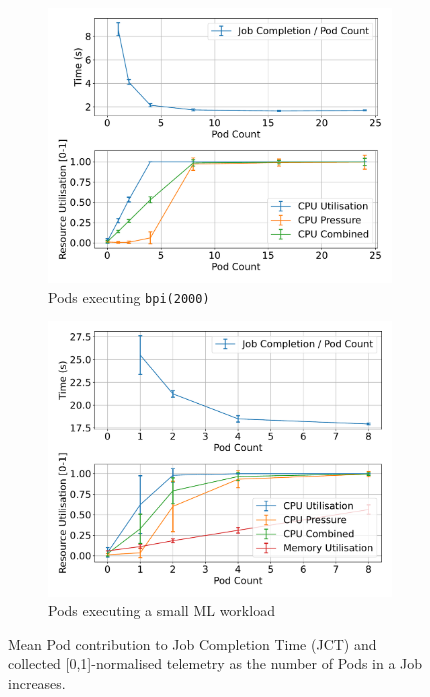 \begin{figure}[ht!] %
    \centering %
    \begin{subfigure}[b]{0.48\textwidth} %
        \centering
        \includegraphics[width=\textwidth]{images/podcount-util-pressure.pdf}
        \caption{Pods executing \texttt{bpi(2000)}} %
    \end{subfigure}%
    \hfill %
    \begin{subfigure}[b]{0.48\textwidth}
        \centering
        \includegraphics[width=\textwidth]{images/ml-podcount-util-pressure.pdf}
        \caption{Pods executing a small ML workload} %
    \end{subfigure}
    \caption{Mean Pod contribution to Job Completion Time (JCT) and collected
    [0,1]-normalised telemetry as the number of Pods in a Job increases.}
    \label{fig:podcount-util-pressure}
\end{figure}

